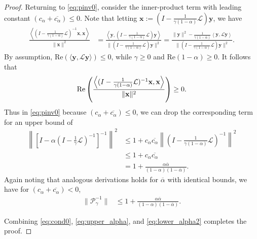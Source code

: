 \documentclass[review]{siamart}
\begin{document}
\begin{proof}
Returning to \eqref{eq:pinv0}, consider the inner-product term with leading
constant $(c_\alpha+\overline{c_\alpha}) \leq 0$. Note that letting
$\mathbf{x}:= (I - \tfrac{1}{\gamma(1-\alpha)}\mathcal{L})\mathbf{y}$,
we have
%
\begin{align*}
\frac{\left\langle (I - \tfrac{1}{\gamma(1-\alpha)}\mathcal{L})^{-1}\mathbf{x},
		\mathbf{x}\right\rangle}{\|\mathbf{x}\|^2}
& = \frac{\left\langle \mathbf{y}, (I - \tfrac{1}{\gamma(1-\alpha)}\mathcal{L})\mathbf{y}
	\right\rangle}{\|(I - \tfrac{1}{\gamma(1-\alpha)}\mathcal{L})\mathbf{y}\|^2}
= \frac{\|\mathbf{y}\|^2 - \frac{1}{\gamma (1 - \overline{\alpha})}
	\left\langle \mathbf{y},\mathcal{L}\mathbf{y} \right\rangle}
	{\|(I - \tfrac{1}{\gamma(1-\alpha)}\mathcal{L})\mathbf{y}\|^2}.
\end{align*}
%
By assumption, Re$\left(\langle \mathbf{y},\mathcal{L}\mathbf{y}\rangle\right) \leq 0$,
while $\gamma\geq 0$ and Re$(1-\alpha) \geq 0$. It follows that
%
\begin{align*}
\textnormal{Re}\left(\frac{\left\langle (I - \tfrac{1}{\gamma(1-\alpha)}\mathcal{L})^{-1}\mathbf{x},
	\mathbf{x}\right\rangle}{\|\mathbf{x}\|^2}\right) \geq 0.
\end{align*}
%
Thus in \eqref{eq:pinv0} because $(c_\alpha+\overline{c_\alpha}) \leq 0$, we can drop
the corresponding term for an upper bound of
%
\begin{align*}
\left\|\left[I - \alpha\left(I - \tfrac{1}{\gamma}\mathcal{L}\right)^{-1}\right]^{-1}\right\|^2 
	& \leq 1 + c_\alpha\overline{c_\alpha}
		\left\|(I - \tfrac{1}{\gamma(1-\alpha)}\mathcal{L})^{-1}\right\|^2 \\
& \leq 1 + c_\alpha\overline{c_\alpha} \\
& = 1 + \frac{\alpha\overline{\alpha}}{(1 - \alpha)(1 - \overline{\alpha})}.
\end{align*}
%
Again noting that analogous derivations holds for $\overline{\alpha}$ with
identical bounds, we have for $(c_\alpha+\overline{c_\alpha}) < 0$,
%
\begin{align}
\|\mathcal{P}_\gamma^{-1}\| & \leq 1 + 
	\frac{\alpha\overline{\alpha}}{(1 - \alpha)(1 - \overline{\alpha})}. \label{eq:lower_alpha2}
\end{align}
% 

Combining \eqref{eq:cond0}, \eqref{eq:upper_alpha},
and \eqref{eq:lower_alpha2} completes the proof.
\end{proof}
%
\end{document}
